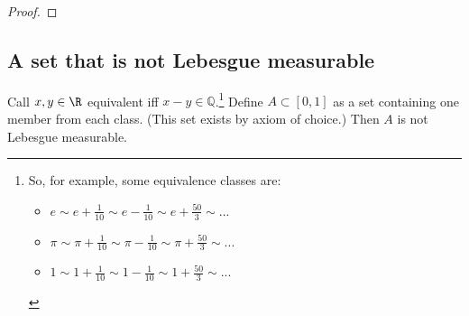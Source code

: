 \documentclass{article} %
\begin{document}
\begin{proof}
\end{proof}

\subsection{A set that is not Lebesgue measurable} \label{sec:set_that_is_not_Lebesgue_measurable}

\begin{proposition}
Call $x,y \in \R$ equivalent iff $x-y \in \mathbb{Q}$.\footnote{So, for example, some equivalence classes are:
\begin{itemize}
\item $e \sim e + \frac{1}{10} \sim e - \frac{1}{10} \sim e+\frac{50}{3} \sim ...$
\item  $\pi \sim \pi + \frac{1}{10} \sim \pi - \frac{1}{10} \sim \pi+\frac{50}{3} \sim ...$
\item $1 \sim 1 + \frac{1}{10} \sim 1 - \frac{1}{10} \sim 1 +\frac{50}{3} \sim ...$
\end{itemize}
} Define $A \subset [0,1]$ as a set containing one member from each class. (This set exists by axiom of choice.) Then $A$ is not Lebesgue measurable.

\label{prop:existence_of_set_that_is_not_Lebesgue_measurable}
\end{proposition}
\end{document}
